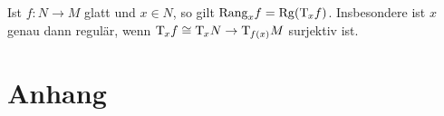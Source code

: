 \begin{bemerkung}[{name=[Zusammenhang mit der Definition des Ranges]}]
	Ist $f \colon N \to M$ glatt und $x \in N$, so gilt $\mathrm{Rang}_x f = \Rg \enbrace*{\Tang_x f}$. 
	Insbesondere ist $x$ genau dann regulär, wenn $\mathrm{T}\mkern-0.85mu_x f \cong \mathrm{T}\mkern-0.85mu_x N \to \mathrm{T}\mkern-0.85mu_{f(x)} M$ surjektiv ist.
\end{bemerkung}
\cleardoubleoddemptypage
{}
\setcounter{page}{1}
\cleardoubleoddemptypage
\appendix

\section{Anhang} %
\label{sec:anhang}

\printindex
\printbibliography
\listoffigures


